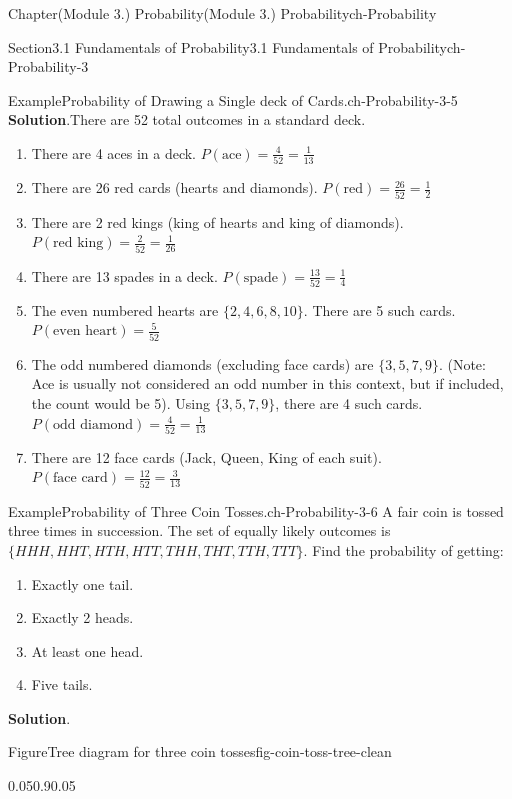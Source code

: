 \documentclass[oneside,10pt,]{book}
\newcommand{\blocktitlefont}{\relax}
\begin{document}
\begin{chapterptx}{Chapter}{(Module 3.) Probability}{}{(Module 3.) Probability}{}{}{ch-Probability}
\begin{sectionptx}{Section}{3.1 Fundamentals of Probability}{}{3.1 Fundamentals of Probability}{}{}{ch-Probability-3}
\begin{example}{Example}{Probability of Drawing a Single deck of Cards.}{ch-Probability-3-5}
\noindent\textbf{\blocktitlefont Solution}.\hypertarget{ch-Probability-3-5-3}{}\quad{}There are 52 total outcomes in a standard deck.%
%
\begin{enumerate}
\item{}There are 4 aces in a deck. \(P(\text{ace}) = \frac{4}{52} = \frac{1}{13}\)%
\item{}There are 26 red cards (hearts and diamonds). \(P(\text{red}) = \frac{26}{52} = \frac{1}{2}\)%
\item{}There are 2 red kings (king of hearts and king of diamonds). \(P(\text{red king}) = \frac{2}{52} = \frac{1}{26}\)%
\item{}There are 13 spades in a deck. \(P(\text{spade}) = \frac{13}{52} = \frac{1}{4}\)%
\item{}The even numbered hearts are \(\{2, 4, 6, 8, 10\}\). There are 5 such cards. \(P(\text{even heart}) = \frac{5}{52}\)%
\item{}The odd numbered diamonds (excluding face cards) are \(\{3, 5, 7, 9\}\). (Note: Ace is usually not considered an odd number in this context, but if included, the count would be 5). Using \(\{3, 5, 7, 9\}\), there are 4 such cards. \(P(\text{odd diamond}) = \frac{4}{52} = \frac{1}{13}\)%
\item{}There are 12 face cards (Jack, Queen, King of each suit). \(P(\text{face card}) = \frac{12}{52} = \frac{3}{13}\)%
\end{enumerate}
\end{example}
\begin{example}{Example}{Probability of Three Coin Tosses.}{ch-Probability-3-6}%
A fair coin is tossed three times in succession. The set of equally likely outcomes is \(\{HHH, HHT, HTH, HTT, THH, THT, TTH, TTT\}\). Find the probability of getting:%
%
\begin{enumerate}
\item{}Exactly one tail.%
\item{}Exactly 2 heads.%
\item{}At least one head.%
\item{}Five tails.%
\end{enumerate}
\par\smallskip%
\noindent\textbf{\blocktitlefont Solution}.\hypertarget{ch-Probability-3-6-3}{}\quad{}\begin{figureptx}{Figure}{Tree diagram for three coin tosses}{fig-coin-toss-tree-clean}{}%
\begin{image}{0.05}{0.9}{0.05}{}%
\resizebox{\linewidth}{!}{%
\begin{tikzpicture}[

\end{tikzpicture}}
\end{image}
\end{figureptx}
\end{example}
\end{sectionptx}
\end{chapterptx}
\end{document}
